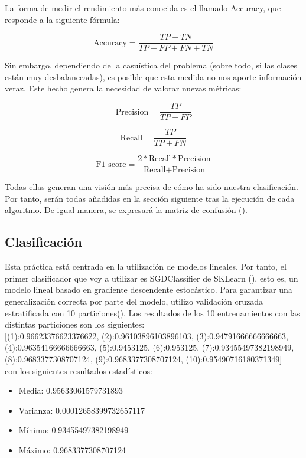 La forma de medir el rendimiento más conocida es el llamado Accuracy, que responde a la siguiente fórmula:

$$\text{Accuracy} = \frac{TP+TN}{TP+FP+FN+TN}$$

Sin embargo, dependiendo de la casuística del problema (sobre todo, si las clases están muy desbalanceadas), es posible que esta medida no nos aporte información veraz. Este hecho genera la necesidad de valorar nuevas métricas:

$$\text{Precision} = \frac{TP}{TP+FP}$$

$$\text{Recall} = \frac{TP}{TP+FN}$$

$$\text{F1-score} = \frac{2*\text{Recall}*\text{Precision}}{\text{Recall}+\text{Precision}}$$

Todas ellas generan una visión más precisa de cómo ha sido nuestra clasificación. Por tanto, serán todas añadidas en la sección siguiente tras la ejecución de cada algoritmo. De igual manera, se expresará la matriz de confusión (\cite{cf}).

\subsection{Clasificación}

Esta práctica está centrada en la utilización de modelos lineales. Por tanto, el primer clasificador que voy a utilizar es SGDClassifier de SKLearn (\cite{SGD-C}), esto  es, un modelo lineal basado en gradiente descendente estocástico. Para garantizar una generalización correcta por parte del modelo, utilizo validación cruzada estratificada con 10 particiones(\cite{stk}). Los resultados de los 10 entrenamientos con las distintas particiones son los siguientes: \\

[(1):0.96623376623376622, (2):0.96103896103896103, (3):0.94791666666666663, (4):0.96354166666666663, (5):0.9453125, (6):0.953125, (7):0.93455497382198949, (8):0.9683377308707124, (9):0.9683377308707124, (10):0.95490716180371349] \\


con los siguientes resultados estadísticos:

\begin{itemize}
	\item Media: 0.95633061579731893
	\item Varianza: 0.00012658399732657117
	\item Mínimo: 0.93455497382198949
	\item Máximo: 0.9683377308707124
\end{itemize}

